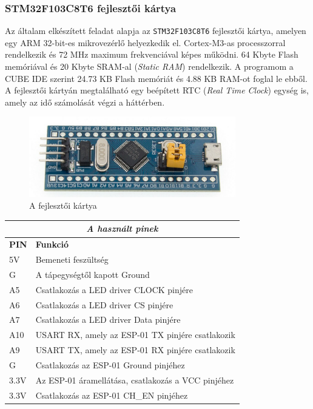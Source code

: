 \documentclass[a4paper, 12pt]{article}
\begin{document}
\subsubsection{STM32F103C8T6 fejlesztői kártya}
Az általam elkészített feladat alapja az \texttt{STM32F103C8T6} fejlesztői kártya, amelyen egy ARM 32-bit-es mikrovezérlő helyezkedik el. Cortex-M3-as processzorral rendelkezik és 72 MHz maximum frekvenciával képes működni. 64 Kbyte Flash memóriával és 20 Kbyte SRAM-al (\textit{Static RAM}) rendelkezik. A programom a CUBE IDE szerint 24.73 KB Flash memóriát és 4.88 KB RAM-ot foglal le ebből.
A fejlesztői kártyán megtalálható egy beépített RTC (\textit{Real Time Clock}) egység is, amely az idő számolását végzi a háttérben.

\begin{figure}[ht]
	\centering
	\includegraphics[width = 9cm]{images/stm32.jpg}
	\caption{A fejlesztői kártya}
	\label{fig:mcu}
\end{figure}

\begin{center}
\begin{tabular}{ | l | l | }
\hline
\multicolumn{2}{|c|}{\textit{\Large{A használt pinek}}} \\
\hline
\textbf{PIN} & \textbf{Funkció}\\
\hline
5V & Bemeneti feszültség\\
G & A tápegységtől kapott Ground\\
\hline
A5 & Csatlakozás a LED driver CLOCK pinjére\\
A6 & Csatlakozás a LED driver CS pinjére\\
A7 & Csatlakozás a LED driver Data pinjére\\
\hline
A10 & USART RX, amely az ESP-01 TX pinjére csatlakozik\\
A9 & USART TX, amely az ESP-01 RX pinjére csatlakozik\\
G & Csatlakozás az ESP-01 Ground pinjéhez\\
3.3V & Az ESP-01 áramellátása, csatlakozás a VCC pinjéhez\\
3.3V & Csatlakozás az ESP-01 CH\_EN pinjéhez\\
\hline
\end{tabular}
\end{center}
\end{document}
